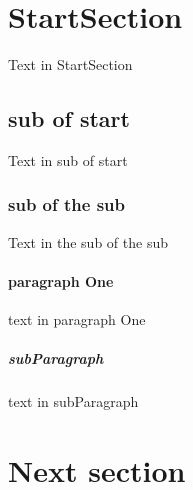 \documentclass{article}
\begin{document}
  \section{StartSection}
Text in StartSection

    \subsection{sub of start}
Text in sub of start

      \subsubsection{sub of the sub}
Text in the sub of the sub

        \paragraph{paragraph One}
text in paragraph One

          \subparagraph{subParagraph}
text in subParagraph
  
  \section{Next section}
    
\end{document}
